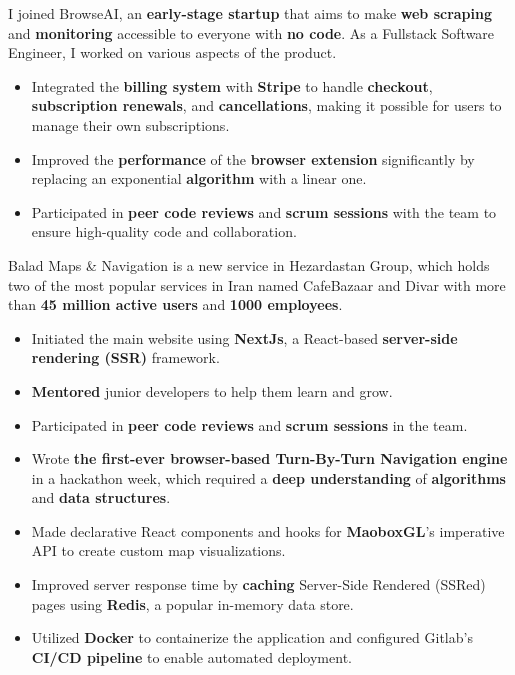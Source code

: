 \bigskip
{}
I joined BrowseAI, an \textbf{early-stage startup} that aims to make \textbf{web scraping} and \textbf{monitoring} accessible to everyone with \textbf{no code}. As a Fullstack Software Engineer, I worked on various aspects of the product.
\medskip
\begin{itemize}
    \item Integrated the \textbf{billing system} with \textbf{Stripe} to handle \textbf{checkout}, \textbf{subscription renewals}, and \textbf{cancellations}, making it possible for users to manage their own subscriptions.
    \item Improved the \textbf{performance} of the \textbf{browser extension} significantly by replacing an exponential \textbf{algorithm} with a linear one.
    \item Participated in \textbf{peer code reviews} and \textbf{scrum sessions} with the team to ensure high-quality code and collaboration.
\end{itemize}

\bigskip
\divider
\bigskip

Balad Maps \& Navigation is a new service in Hezardastan Group, which holds two of the most popular services in Iran named CafeBazaar and Divar with more than \textbf{45 million active users} and \textbf{1000 employees}.
\medskip
\begin{itemize}
    \item Initiated the main website using \textbf{NextJs}, a React-based \textbf{server-side rendering (SSR)} framework.
    \item \textbf{Mentored} junior developers to help them learn and grow.
    \item Participated in \textbf{peer code reviews} and \textbf{scrum sessions} in the team.
    \item Wrote \textbf{the first-ever browser-based Turn-By-Turn Navigation engine} in a hackathon week, which required a \textbf{deep understanding} of \textbf{algorithms} and \textbf{data structures}.
    \item Made declarative React components and hooks for \textbf{MaoboxGL}'s imperative API to create custom map visualizations.
    \item Improved server response time by \textbf{caching} Server-Side Rendered (SSRed) pages using \textbf{Redis}, a popular in-memory data store.
    \item Utilized \textbf{Docker} to containerize the application and configured Gitlab's \textbf{CI/CD pipeline} to enable automated deployment.
\end{itemize}


